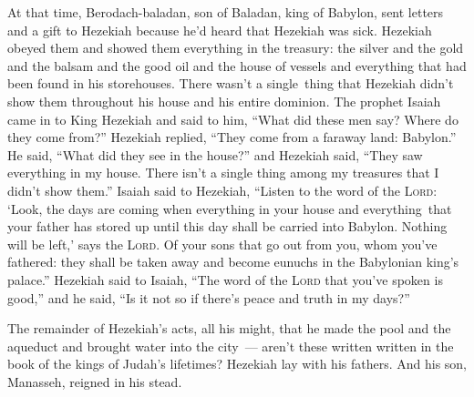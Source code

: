 \begin{inparaenum}
   At that time, Berodach-baladan, son of Baladan, king of Babylon, sent letters and a gift to Hezekiah because he'd heard that Hezekiah was sick.%
   Hezekiah obeyed them and showed them everything in the treasury: the silver and the gold and the balsam and the good oil and the house of vessels and everything that had been found in his storehouses. There wasn't a single\understood\ thing that Hezekiah didn't show them throughout his house and his entire dominion.%
   The prophet Isaiah came in to King Hezekiah and said to him, ``What did these men say? Where do they come from?'' Hezekiah replied, ``They come from a faraway land: Babylon.''%
   He said, ``What did they see in the house?'' and Hezekiah said, ``They saw everything in my house. There isn't a single thing among my treasures that I didn't show them.''%
   Isaiah said to Hezekiah, ``Listen to the word of the \textsc{Lord}:%
   `Look, the days are coming when everything in your house and everything\understood\ that your father has stored up until this day shall be carried into Babylon. Nothing will be left,' says the \textsc{Lord}.%
   Of your sons that go out from you, whom you've fathered: they shall be taken away and become eunuchs in the Babylonian king's palace.''%
   Hezekiah said to Isaiah, ``The word of the \textsc{Lord} that you've spoken is good,'' and he said, ``Is it not so if there's peace and truth in my days?''%
  
   The remainder of Hezekiah's acts, all his might, that he made the pool and the aqueduct and brought water into the city~--- aren't these written written in the book of the kings of Judah's lifetimes?%
   Hezekiah lay with his fathers. And his son, Manasseh, reigned in his stead.%
\end{inparaenum}
